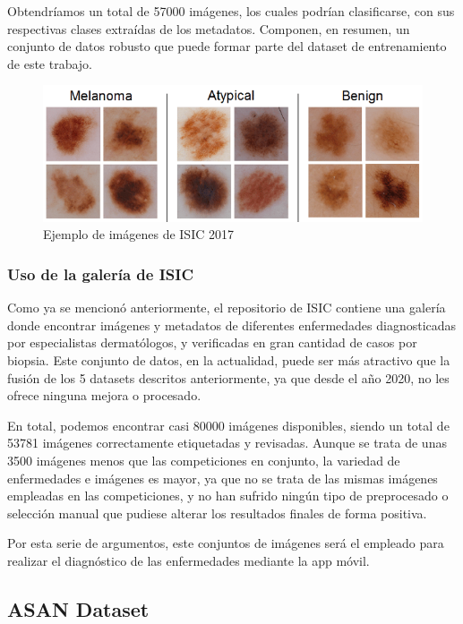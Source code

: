 Obtendríamos un total de 57000 imágenes, los cuales podrían clasificarse, con sus respectivas clases extraídas de los metadatos. Componen, en resumen, un conjunto de datos robusto que puede formar parte del dataset de entrenamiento de este trabajo.
\begin{figure}[H]
	\centering
	\includegraphics[scale = 0.5]{imagenes/Ejemplo2020.png}
	\caption{Ejemplo de imágenes de ISIC 2017}
	\label{fig:enter-label}
\end{figure}

\subsubsection{Uso de la galería de ISIC}

Como ya se mencionó anteriormente, el repositorio de ISIC contiene una galería donde encontrar imágenes y metadatos de diferentes enfermedades diagnosticadas por especialistas dermatólogos, y verificadas en gran cantidad de casos por biopsia. Este conjunto de datos, en la actualidad, puede ser más atractivo que la fusión de los  5 datasets descritos anteriormente, ya que desde el año 2020, no les ofrece ninguna mejora o procesado.

En total, podemos encontrar casi 80000 imágenes disponibles, siendo un total de 53781 imágenes correctamente etiquetadas y revisadas. Aunque se trata de unas 3500 imágenes menos que las competiciones en conjunto, la variedad de enfermedades e imágenes es mayor, ya que no se trata de las mismas imágenes empleadas en las competiciones, y no han sufrido ningún tipo de preprocesado o selección manual que pudiese alterar los resultados finales de forma positiva.

Por esta serie de argumentos, este conjuntos de imágenes será el empleado para realizar el diagnóstico de las enfermedades mediante la app móvil.

\subsection{ASAN Dataset}


